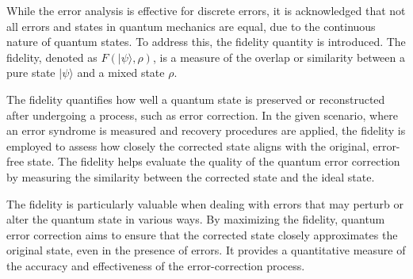 \documentclass[12pt]{report}
\begin{document}
\begin{minipage}{1 \textwidth}
		While the error analysis is effective for discrete errors, it is acknowledged that not all errors and states in quantum mechanics are equal, due to the continuous nature of quantum states. To address this, the fidelity quantity is introduced. \newline
		The fidelity, denoted as $F(|\psi \rangle, \rho)$, is a measure of the overlap or similarity between a pure state $| \psi \rangle$  and a mixed state $\rho$. \newline
		
		The fidelity quantifies how well a quantum state is preserved or reconstructed after undergoing a process, such as error correction. 
		In the given scenario, where an error syndrome is measured and recovery procedures are applied, the fidelity is employed to assess how closely the corrected state aligns with the original, error-free state. 
		The fidelity helps evaluate the quality of the quantum error correction by measuring the similarity between the corrected state and the ideal state. \newline
		
		
		
	\end{minipage}
	
	\begin{minipage}{1 \textwidth}
		
		The fidelity is particularly valuable when dealing with errors that may perturb or alter the quantum state in various ways. By maximizing the fidelity, quantum error correction aims to ensure that the corrected state closely approximates the original state, even in the presence of errors. It provides a quantitative measure of the accuracy and effectiveness of the error-correction process. \newline
		
	\end{minipage}
\end{document}

